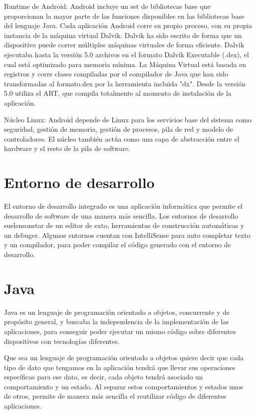 Runtime de Android: Android incluye un set de bibliotecas base que proporcionan la mayor parte de las funciones disponibles en las bibliotecas base del lenguaje Java. Cada aplicación Android corre su propio proceso, con su propia instancia de la máquina virtual Dalvik. Dalvik ha sido escrito de forma que un dispositivo puede correr múltiples máquinas virtuales de forma eficiente. Dalvik ejecutaba hasta la versión 5.0 archivos en el formato Dalvik Executable (.dex), el cual está optimizado para memoria mínima. La Máquina Virtual está basada en registros y corre clases compiladas por el compilador de Java que han sido transformadas al formato.dex por la herramienta incluida "dx". Desde la versión 5.0 utiliza el ART, que compila totalmente al momento de instalación de la aplicación.

Núcleo Linux: Android depende de Linux para los servicios base del sistema como seguridad, gestión de memoria, gestión de procesos, pila de red y modelo de controladores. El núcleo también actúa como una capa de abstracción entre el hardware y el resto de la pila de software.\cite{Android}

\section{Entorno de desarrollo}
El entorno de desarrollo integrado es una aplicación informática que permite el desarrollo de software de una manera más sencilla. Los entornos de desarrollo suelensonstar de un editor de exto, herramientas de construcción automáticas y un debuger.
Algunos entornos cuentan con IntelliSense para auto completar texto y un compilador, para poder compilar el código generado con el entorno de desarrollo.


\section{Java}
Java es un lenguaje de programación orientado a objetos, concurrente y de propósito general, y buscaba la independencia de la implementación de las aplicaciones, para conseguir poder ejecutar un mismo código sobre diferentes dispositivos con tecnologías diferentes.

Que sea un lenguaje de programación orientado a objetos quiere decir que cada tipo de dato que tengamos en la aplicación tendrá que llevar sus operaciones específicas para ese dato, es decir, cada objeto tendrá asociado un comportamiento y un estado.
Al separar estos comportamientos y estados unos de otros, permite de manera más sencilla el reutilizar código de diferentes aplicaciones.

